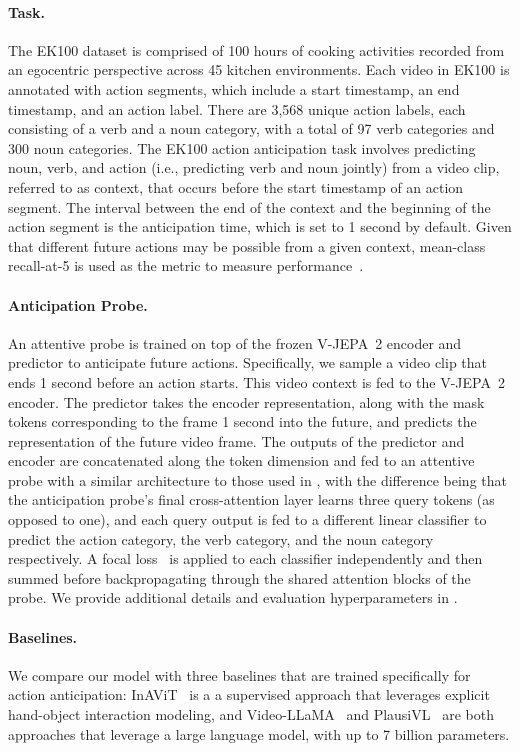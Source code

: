 \documentclass[]{fairmeta}
\newcommand{\model}{V-JEPA~2\xspace}
\begin{document}
\paragraph{\bf Task.}
The EK100 dataset is comprised of 100 hours of cooking activities recorded from an egocentric perspective across 45 kitchen environments. Each video in EK100 is annotated with action segments, which include a start timestamp, an end timestamp, and an action label. There are 3,568 unique action labels, each consisting of a verb and a noun category, with a total of 97 verb categories and 300 noun categories. The EK100 action anticipation task involves predicting noun, verb, and action (i.e., predicting verb and noun jointly) from a video clip, referred to as context, that occurs before the start timestamp of an action segment. The interval between the end of the context and the beginning of the action segment is the anticipation time, which is set to 1 second by default. Given that different future actions may be possible from a given context, mean-class recall-at-5 is used as the metric to measure performance~\citep{Damen2022RESCALING}.

\paragraph{\bf Anticipation Probe.}
An attentive probe is trained on top of the frozen \model encoder and predictor to anticipate future actions.
Specifically, we sample a video clip that ends 1 second before an action starts. This video context is fed to the \model encoder. The predictor takes the encoder representation, along with the mask tokens corresponding to the frame 1 second into the future, and predicts the representation of the future video frame. The outputs of the predictor and encoder are concatenated along the token dimension and fed to an attentive probe with a similar architecture to those used in , with the difference being that the anticipation probe's final cross-attention layer learns three query tokens (as opposed to one), and each query output is fed to a different linear classifier to predict the action category, the verb category, and the noun category respectively.
A focal loss~\citep{lin2017focal} is applied to each classifier independently and then summed before backpropagating through the shared attention blocks of the probe.
We provide additional details and evaluation hyperparameters in .

\paragraph{\bf Baselines.} We compare our model with three baselines that are trained specifically for action anticipation: InAViT~\citep{roy2024interaction} is a a supervised approach that leverages explicit hand-object interaction modeling, and Video-LLaMA~\citep{zhang2023video} and PlausiVL~\citep{mittal2024can} are both approaches that leverage a large language model, with up to 7 billion parameters.
\end{document}
